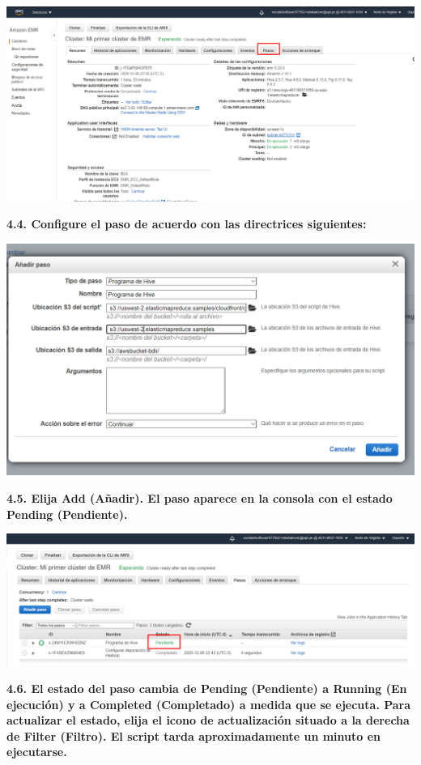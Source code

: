 \documentclass{article}
\begin{document}
    \begin{center}
		\includegraphics[width=15cm]{./images/23} 
	\end{center}

\textbf{4.4. Configure el paso de acuerdo con las directrices siguientes:
}

    \begin{center}
		\includegraphics[width=15cm]{./images/24} 
	\end{center}

\newpage
\textbf{4.5. Elija Add (Añadir). El paso aparece en la consola con el estado Pending (Pendiente). 
}

    \begin{center}
		\includegraphics[width=15cm]{./images/25} 
	\end{center}
\textbf{4.6. El estado del paso cambia de Pending (Pendiente) a Running (En ejecución) y a Completed
(Completado) a medida que se ejecuta. Para actualizar el estado, elija el icono de actualización situado
a la derecha de Filter (Filtro). El script tarda aproximadamente un minuto en ejecutarse. 
}
\end{document}
